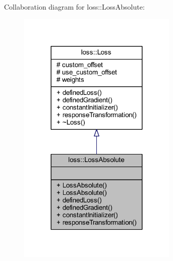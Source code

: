 Collaboration diagram for loss\+:\+:Loss\+Absolute\+:
\nopagebreak
\begin{figure}[H]
\begin{center}
\leavevmode
\includegraphics[width=215pt]{classloss_1_1_loss_absolute__coll__graph}
\end{center}
\end{figure}
